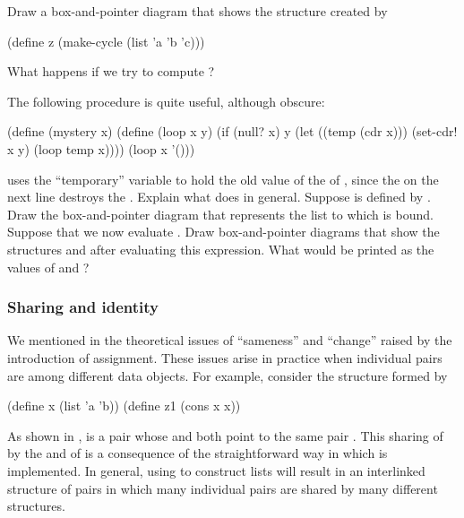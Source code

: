 \begin{exerciseGroup}
Draw a box-and-pointer diagram that shows the structure  created by

\begin{codeBlock}
(define z (make-cycle (list 'a 'b 'c)))
\end{codeBlock}

What happens if we try to compute ?

\label{Exercise 3.14}
 The following procedure is quite
useful, although obscure:

\begin{codeBlock}
(define (mystery x)
  (define (loop x y)
    (if (null? x)
        y
        (let ((temp (cdr x)))
          (set-cdr! x y)
          (loop temp x))))
  (loop x '()))
\end{codeBlock}

 uses the ``temporary'' variable  to hold the old value
of the  of , since the   on the next line
destroys the .  Explain what  does in general.  Suppose
 is defined by . Draw the
box-and-pointer diagram that represents the list to which  is bound.
Suppose that we now evaluate . Draw
box-and-pointer diagrams that show the structures  and  after
evaluating this expression.  What would be printed as the values of 
and ?
\end{exerciseGroup}

\subsubsection*{Sharing and identity}

We mentioned in  the theoretical issues of ``sameness'' and
``change'' raised by the introduction of assignment.  These issues arise in
practice when individual pairs are  among different data
objects.  For example, consider the structure formed by

\begin{codeBlock}
(define x (list 'a 'b))
(define z1 (cons x x))
\end{codeBlock}

\noindent
As shown in ,  is a pair whose  and
 both point to the same pair .  This sharing of  by
the  and  of  is a consequence of the
straightforward way in which  is implemented.  In general, using
 to construct lists will result in an interlinked structure of pairs
in which many individual pairs are shared by many different structures.

